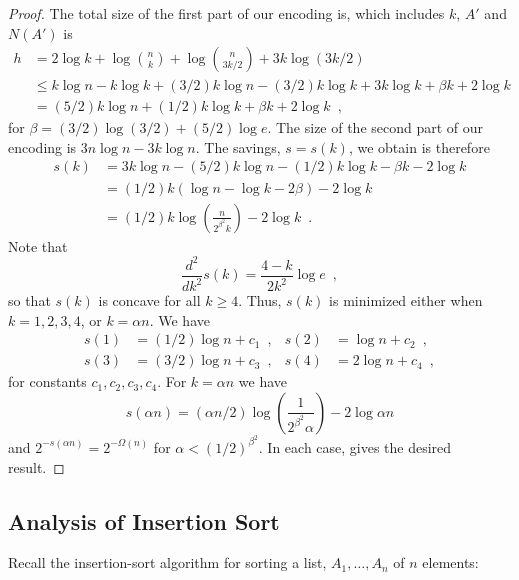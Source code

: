 \documentclass{patmorin}
\begin{document}
\begin{proof}
  The total size of the first part of our encoding is, which includes
  $k$, $A'$ and $N(A')$ is
  \begin{align*}
    h & = 2\log k + \log\binom{n}{k} + \log\binom{n}{3k/2} + 3k\log (3k/2) \\
      & \le k\log n - k\log k + (3/2)k\log n - (3/2)k\log k + 3k\log k + \beta k + 2 \log k \\
      & = (5/2)k\log n + (1/2)k\log k + \beta k + 2 \log k  \enspace ,
  \end{align*}
  for $\beta = (3/2) \log (3/2) + (5/2) \log e$. The size of the
  second part of our encoding is $3n\log n - 3k\log n$.  The savings,
  $s=s(k)$, we obtain is therefore
  \begin{align*}
    s(k) & = 3k\log n - (5/2)k\log n - (1/2)k\log k - \beta k - 2 \log k \\
         & = (1/2)k(\log n - \log k - 2 \beta) - 2\log k \\
         & = (1/2)k\log\left(\frac{n}{2^{\beta^2} k}\right) - 2 \log k \enspace .
  \end{align*}
  Note that
  \[
  \frac{d^2}{dk^2} s(k) = \frac{4 - k}{2 k^2} \log e \enspace ,
  \]
  so that $s(k)$ is concave for all $k \geq 4$. Thus, $s(k)$ is
  minimized either when $k = 1, 2, 3, 4$, or $k = \alpha n$. We have
  \begin{align*}
    s(1) &= (1/2)\log n + c_1 \enspace , & 
    s(2) &= \log n + c_2 \enspace , \\
    s(3) &= (3/2) \log n + c_3 \enspace , &
    s(4) &= 2 \log n + c_4 \enspace ,
  \end{align*}
  for constants $c_1, c_2, c_3, c_4$. For $k=\alpha n$ we have
  \[
  s(\alpha n) = (\alpha n/2)\log \left(\frac{1}{2^{\beta^2} \alpha}\right)
  - 2 \log \alpha n
  \]
  and $2^{-s(\alpha n)} = 2^{-\Omega(n)}$ for
  $\alpha < (1/2)^{\beta^2}$. In each case,  gives the
  desired result.
\end{proof}

\subsection{Analysis of Insertion Sort}

Recall the insertion-sort algorithm for sorting a list, $A_1,\ldots,A_n$
of $n$ elements:

\begin{algorithmic}[1]
     \ENDWHILE
  \ENDFOR
\end{algorithmic}
\end{document}
